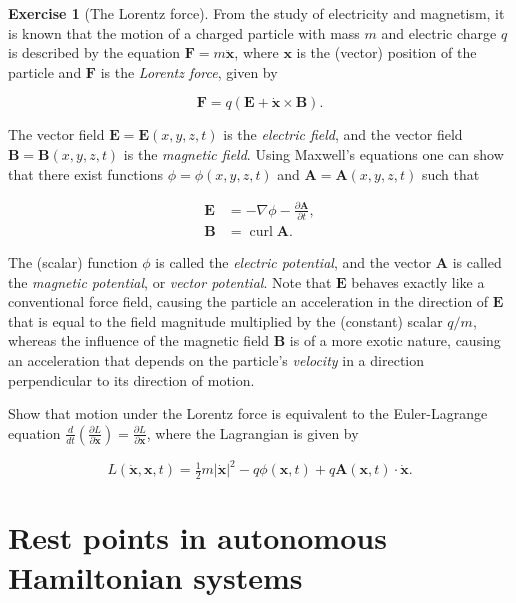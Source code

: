 \documentclass[11pt]{report}
\theoremstyle{plain}
\theoremstyle{definition}
\newtheorem{xexercise}[thm]{Exercise}
\begin{document}
\begin{xexercise}[The Lorentz force]
From the study of electricity and magnetism, it is
known that the motion of a charged particle with mass
$m$ and electric charge $q$ is described by the
equation $\mathbf{F}=m \ddot{\mathbf{x}}$, where
$\mathbf{x}$ is the (vector) position of the particle
and $\mathbf{F}$ is the \emph{Lorentz force}, given by

\[
\mathbf{F} = q\left(\mathbf{E} + \dot{\mathbf{x}}\times \mathbf{B}\right).
\]

\noindent The vector field $\mathbf{E}=\mathbf{E}(x,y,z,t)$ is
the \emph{electric field}, and the vector field
$\mathbf{B}=\mathbf{B}(x,y,z,t)$ is the \emph{magnetic
field}. Using Maxwell's equations one can show that
there exist functions $\phi=\phi(x,y,z,t)$ and
$\mathbf{A}=\mathbf{A}(x,y,z,t)$ such that

\begin{align*}
\mathbf{E} &= - \nabla \phi - \frac{\partial \mathbf{A}}{\partial t}, \\
\mathbf{B} &= \operatorname{curl} \mathbf{A}.
\end{align*}

\noindent The (scalar) function $\phi$ is called the \emph{electric
potential}, and the vector $\mathbf{A}$ is called the
\emph{magnetic potential}, or \emph{vector potential}. Note that
$\mathbf{E}$ behaves exactly like a conventional force
field, causing the particle an acceleration in the
direction of $\mathbf{E}$ that is equal to the field
magnitude multiplied by the (constant) scalar $q/m$,
whereas the influence of the magnetic field
$\mathbf{B}$ is of a more exotic nature, causing an
acceleration that depends on the particle's \emph{velocity}
in a direction perpendicular to its direction of
motion.

Show that motion under the Lorentz force is equivalent
to the Euler-Lagrange equation
$\frac{d}{dt}\left(\frac{\partial L}{\partial
\dot{\mathbf{x}}}\right)=\frac{\partial L}{\partial
\mathbf{x}}$,
where the Lagrangian is given by

\[
L(\dot{\mathbf{x}},\mathbf{x},t) = \tfrac12 m |\dot{\mathbf{x}}|^2 - q \phi(\mathbf{x},t) +q \mathbf{A}(\mathbf{x},t)\cdot \dot{\mathbf{x}}.
\]

\end{xexercise}

\section{Rest points in autonomous Hamiltonian systems}
\end{document}
